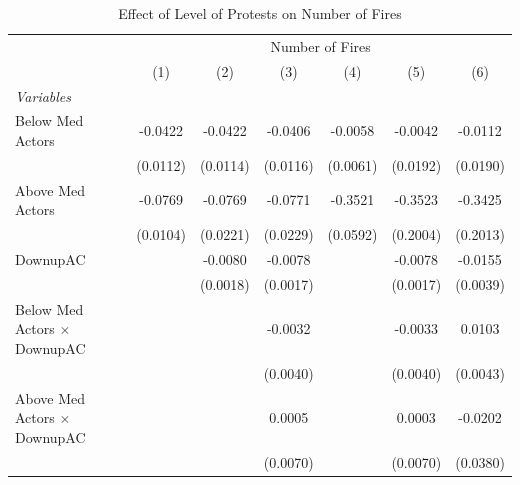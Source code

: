 
\begin{table}[htbp]
   \caption{\label{tab:protest_treat_main} Effect of Level of Protests on Number of Fires}
   \centering
   \begin{tabular}{lcccccc}
      \tabularnewline \midrule \midrule
       & \multicolumn{6}{c}{Number of Fires}\\
                                                                          & (1)           & (2)           & (3)           & (4)           & (5)           & (6)\\  
      \midrule
      \emph{Variables}\\
      Below Med Actors                                                    & -0.0422       & -0.0422       & -0.0406       & -0.0058       & -0.0042       & -0.0112\\   
                                                                          & (0.0112)      & (0.0114)      & (0.0116)      & (0.0061)      & (0.0192)      & (0.0190)\\   
      Above Med Actors                                                    & -0.0769       & -0.0769       & -0.0771       & -0.3521       & -0.3523       & -0.3425\\   
                                                                          & (0.0104)      & (0.0221)      & (0.0229)      & (0.0592)      & (0.2004)      & (0.2013)\\   
      DownupAC                                                            &               & -0.0080       & -0.0078       &               & -0.0078       & -0.0155\\   
                                                                          &               & (0.0018)      & (0.0017)      &               & (0.0017)      & (0.0039)\\   
      Below Med Actors $\times$ DownupAC                                  &               &               & -0.0032       &               & -0.0033       & 0.0103\\   
                                                                          &               &               & (0.0040)      &               & (0.0040)      & (0.0043)\\   
      Above Med Actors $\times$ DownupAC                                  &               &               & 0.0005        &               & 0.0003        & -0.0202\\   
                                                                          &               &               & (0.0070)      &               & (0.0070)      & (0.0380)\\   

\end{tabular}
\end{table}
